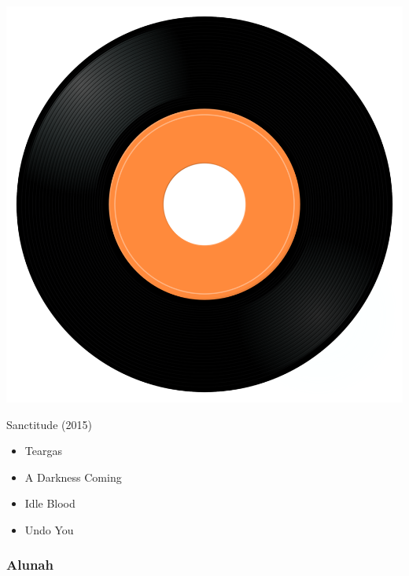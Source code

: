 \begin{minipage}[t]{0.25\textwidth}
\captionsetup{type=figure}
\includegraphics[width=\textwidth]{Images/cover.png}
\caption*{Sanctitude (2015)}
\end{minipage}
\begin{minipage}[t]{0.25\textwidth}\vspace{0pt}
\begin{itemize}[nosep,leftmargin=1em,labelwidth=*,align=left]
	\setlength{\itemsep}{0pt}
	\item Teargas
	\item A Darkness Coming
	\item Idle Blood
	\item Undo You
\end{itemize}
\end{minipage}

\subsubsection{Alunah}

